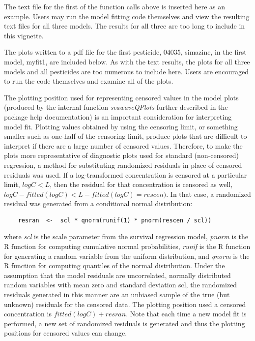 \documentclass[11pt]{article}
\begin{document}
The text file for the first of the function calls above is inserted here as an example.  Users may run the model fitting code themselves and view the resulting text files for all three models.  The results for all three are too long to include in this vignette.

\vspace{5 mm}

%

\vspace{5 mm}

The plots written to a pdf file for the first pesticide, 04035, simazine, in the first model, myfit1, are included below.  As with the text results, the plots for all three models and all pesticides are too numerous to include here.  Users are encouraged to run the code themselves and examine all of the plots.



\vspace{5 mm}

The plotting position used for representing censored values in the model plots (produced by the internal function \textit{seawaveQPlots} further described in the package help documentation) is an important consideration for interpreting model fit.  Plotting values obtained by using the censoring limit, or something smaller such as one-half of the censoring limit, produce plots that are difficult to interpret if there are a large number of censored values.  Therefore, to make the plots more representative of diagnostic plots used for standard (non-censored) regression,  a method for substituting randomized residuals in place of censored residuals was used.   If a log-transformed concentration is censored at a particular limit, $logC < L$, then the residual for that concentration is censored as well, $logC - fitted(logC) < L - fitted(logC) = rescen)$.  In that case, a randomized residual was generated from a conditional normal distribution:
\begin{verbatim}
	resran  <-  scl * qnorm(runif(1) * pnorm(rescen / scl))
\end{verbatim}
where \textit{scl} is the scale parameter from the survival regression model, \textit{pnorm} is the R function for computing cumulative normal probabilities, \textit{runif} is the R function for generating a random variable from the uniform distribution, and \textit{qnorm} is the R function for computing quantiles of the normal distribution.  Under the assumption that the model residuals are uncorrelated, normally distributed random variables with mean zero and standard deviation scl, the randomized residuals generated in this manner are an unbiased sample of the true (but unknown) residuals for the censored data.  The plotting position used a censored concentration is $fitted(logC) + resran$.  Note that each time a new model fit is performed, a new set of randomized residuals is generated and thus the plotting positions for censored values can change.
\end{document}
